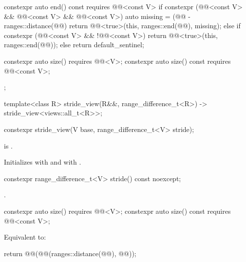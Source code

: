 \begin{codeblock}
{{    constexpr auto end() const requires @@<const V> {
      if constexpr (@@<const V> && @@<const V> && @@<const V>) {
        auto missing = (@@ - ranges::distance(@@) %
        return @@<true>(this, ranges::end(@@), missing);
      } else if constexpr (@@<const V> && !@@<const V>) {
        return @@<true>(this, ranges::end(@@));
      } else {
        return default_sentinel;
      }
    }

    constexpr auto size() requires @@<V>;
    constexpr auto size() const requires @@<const V>;
  };

  template<class R>
    stride_view(R&&, range_difference_t<R>) -> stride_view<views::all_t<R>>;
}
\end{codeblock}

%
\begin{itemdecl}
constexpr stride_view(V base, range_difference_t<V> stride);
\end{itemdecl}

\begin{itemdescr}
\pnum
\expects
{} is .

\pnum
\effects
Initializes  with  and
 with .
\end{itemdescr}

%
\begin{itemdecl}
constexpr range_difference_t<V> stride() const noexcept;
\end{itemdecl}

\begin{itemdescr}
\pnum
\returns
{}.
\end{itemdescr}

%
\begin{itemdecl}
constexpr auto size() requires @@<V>;
constexpr auto size() const requires @@<const V>;
\end{itemdecl}

\begin{itemdescr}
\pnum
\effects
Equivalent to:
\begin{codeblock}
return @@(@@(ranges::distance(@@), @@));
\end{codeblock}
\end{itemdescr}


